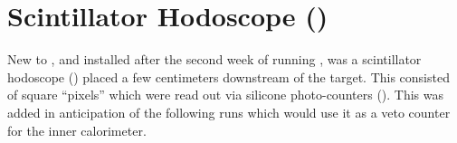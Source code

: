 \section{Scintillator Hodoscope ()}\label{sec:clas.sh}


New to , and installed after the second week of running , was a scintillator hodoscope () placed a few centimeters downstream of the target. This consisted of square ``pixels'' which were read out via silicone photo-counters (). This was added in anticipation of the following runs which would use it as a veto counter for the inner calorimeter.
